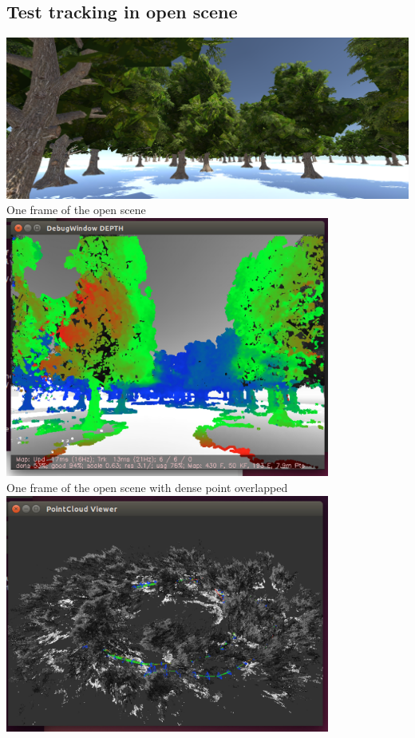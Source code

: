 \documentclass[11pt, oneside]{article}   	%
\begin{document}
\subsection{Test tracking in open scene}
\includegraphics[width=1.0\textwidth]{i4}\\
One frame of the open scene\\
\includegraphics[width=0.8\textwidth]{i3}\\
One frame of the open scene with dense point overlapped\\
\includegraphics[width=0.8\textwidth]{i1}\\
\end{document}
